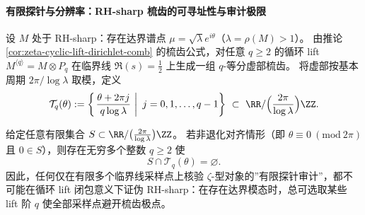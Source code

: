 \paragraph{有限探针与分辨率：RH-sharp 梳齿的可寻址性与审计极限}
设 \(M\) 处于 RH-sharp：存在达界谱点 \(\mu=\sqrt{\lambda}e^{i\theta}\)（\(\lambda=\rho(M)>1\)）。
由推论 \ref{cor:zeta-cyclic-lift-dirichlet-comb} 的梳齿公式，对任意 \(q\ge 2\) 的循环 lift
\(
M^{\langle q\rangle}=M\otimes P_q
\)
在临界线 \(\Re(s)=\tfrac12\) 上生成一组 \(q\)-等分虚部梳齿。
将虚部按基本周期 \(2\pi/\log\lambda\) 取模，定义
\[
\mathcal T_q(\theta):=
\left\{\left.\frac{\theta+2\pi j}{q\log\lambda}\ \right|\ j=0,1,\dots,q-1\right\}
\ \subset\ \RR/\Bigl(\frac{2\pi}{\log\lambda}\Bigr)\ZZ .
\]

\begin{theorem}\label{thm:zeta-cyclic-lift-finite-probe-evasion}
给定任意有限集合
\(
S\subset \RR/\bigl(\tfrac{2\pi}{\log\lambda}\bigr)\ZZ
\)。
若非退化对齐情形（即 \(\theta\equiv 0\ (\mathrm{mod}\ 2\pi)\) 且 \(0\in S\)），则存在无穷多个整数 \(q\ge 2\) 使
\[
S\cap \mathcal T_q(\theta)=\varnothing.
\]
因此，任何仅在有限多个临界线采样点上核验 \(\zeta\)-型对象的”有限探针审计”，都不可能在循环 lift 闭包意义下证伪 RH-sharp：在存在达界模态时，总可选取某些 lift 阶 \(q\) 使全部采样点避开梳齿极点。
\end{theorem}
